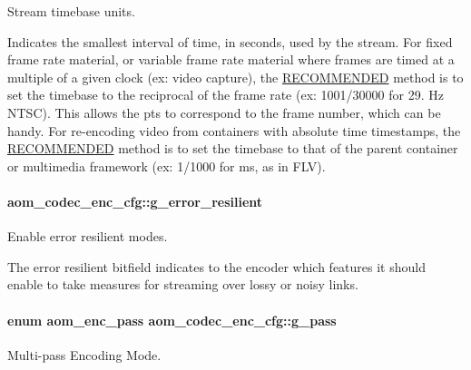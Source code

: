 Stream timebase units. 

Indicates the smallest interval of time, in seconds, used by the stream. For fixed frame rate material, or variable frame rate material where frames are timed at a multiple of a given clock (ex\+: video capture), the \hyperlink{rfc2119_RECOMMENDED}{R\+E\+C\+O\+M\+M\+E\+N\+D\+ED} method is to set the timebase to the reciprocal of the frame rate (ex\+: 1001/30000 for 29. Hz N\+T\+SC). This allows the pts to correspond to the frame number, which can be handy. For re-\/encoding video from containers with absolute time timestamps, the \hyperlink{rfc2119_RECOMMENDED}{R\+E\+C\+O\+M\+M\+E\+N\+D\+ED} method is to set the timebase to that of the parent container or multimedia framework (ex\+: 1/1000 for ms, as in F\+LV). 
\paragraph[{\texorpdfstring{g\+\_\+error\+\_\+resilient}{g_error_resilient}}]{ aom\+\_\+codec\+\_\+enc\+\_\+cfg\+::g\+\_\+error\+\_\+resilient}\hypertarget{structaom__codec__enc__cfg_a8f3763485bb1f6eea6466b2fe0da2304}{}\label{structaom__codec__enc__cfg_a8f3763485bb1f6eea6466b2fe0da2304}


Enable error resilient modes. 

The error resilient bitfield indicates to the encoder which features it should enable to take measures for streaming over lossy or noisy links. 
\paragraph[{\texorpdfstring{g\+\_\+pass}{g_pass}}]{\setlength{\rightskip}{0pt plus 5cm}enum {\bf aom\+\_\+enc\+\_\+pass} aom\+\_\+codec\+\_\+enc\+\_\+cfg\+::g\+\_\+pass}\hypertarget{structaom__codec__enc__cfg_aad58e4d10c7904d50ce959aef202dc64}{}\label{structaom__codec__enc__cfg_aad58e4d10c7904d50ce959aef202dc64}


Multi-\/pass Encoding Mode. 

